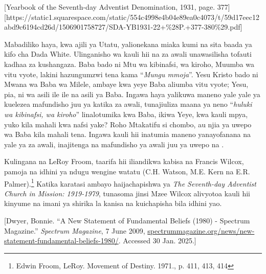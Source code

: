 [Yearbook of the Seventh-day Adventist Denomination, 1931, page. 377][https://static1.squarespace.com/static/554c4998e4b04e89ea0c4073/t/59d17eec12abd9c6194cd26d/1506901758727/SDA-YB1931-22+\%28P.+377-380\%29.pdf]


Mabadiliko haya, kwa ajili ya Utatu, yalionekana miaka kumi na sita baada ya kifo cha Dada White. Ulinganisho wa kauli hii na  za awali unawasilisha tofauti kadhaa za kushangaza. Baba bado ni Mtu wa kibinafsi, wa kiroho, Muumba wa vitu vyote, lakini hazungumzwi tena kama “\textit{Mungu mmoja}”. Yesu Kristo bado ni Mwana wa Baba wa Milele, ambaye kwa yeye Baba aliumba vitu vyote; Yesu, pia, ni wa asili ile ile na asili ya Baba. Ingawa haya yalikuwa maneno yale yale ya kuelezea mafundisho juu ya  katika  za awali, tunajiuliza maana ya neno “\textit{huluki wa kibinafsi, wa kiroho}” linalotumika kwa Baba, ikiwa Yeye, kwa kauli mpya, yuko kila mahali kwa nafsi yake? Roho Mtakatifu si chombo, au njia ya uwepo wa Baba kila mahali tena. Ingawa kauli hii inatumia maneno yanayofanana na yale ya  za awali, inajitenga na mafundisho ya awali juu ya uwepo na .


Kulingana na LeRoy Froom, taarifa hii iliandikwa kabisa na Francis Wilcox, pamoja na idhini ya ndugu wengine watatu (C.H. Watson, M.E. Kern na E.R. Palmer).\footnote{Edwin Froom, LeRoy. Movement of Destiny. 1971., p. 411, 413, 414} Katika karatasi ambayo haijachapishwa ya \textit{The Seventh-day Adventist Church in Mission: 1919-1979}, tunasoma jinsi Mzee Wilcox alivyotoa kauli hii kinyume na imani ya shirika la kanisa na kuichapisha bila idhini yao.


[Dwyer, Bonnie. “A New Statement of Fundamental Beliefs (1980) - Spectrum Magazine.” \textit{Spectrum Magazine}, 7 June 2009, \href{https://spectrummagazine.org/news/new-statement-fundamental-beliefs-1980/}{spectrummagazine.org/news/new-statement-fundamental-beliefs-1980/}. Accessed 30 Jan. 2025.]


